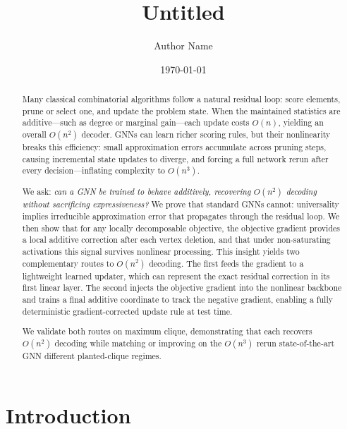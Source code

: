 \documentclass[11pt]{article}
\title{Untitled}
\author{Author Name}
\date{\today}
\theoremstyle{plain}
\theoremstyle{definition}
\theoremstyle{remark}
\begin{document}
\maketitle

\begin{abstract}
  Many classical combinatorial algorithms follow a natural residual loop: score
  elements, prune or select one, and update the problem state. When the maintained
  statistics are additive---such as degree or marginal gain---each update costs $O(n)$,
  yielding an overall $O(n^2)$ decoder. GNNs can learn richer scoring rules, but their
  nonlinearity breaks this efficiency: small approximation errors accumulate across
  pruning steps, causing incremental state updates to diverge, and forcing a full
  network rerun after every decision---inflating complexity to $O(n^3)$.

  We ask: \textit{can a GNN be trained to behave additively, recovering $O(n^2)$
  decoding without sacrificing expressiveness?} We prove that standard GNNs cannot:
  universality implies irreducible approximation error that propagates through the
  residual loop. We then show that for any locally decomposable objective, the objective
  gradient provides a local additive correction after each vertex deletion, and that
  under non-saturating activations this signal survives nonlinear processing. This
  insight yields two complementary routes to $O(n^2)$ decoding. The first feeds the
  gradient to a lightweight learned updater, which can represent the exact residual
  correction in its first linear layer. The second injects the objective gradient into
  the nonlinear backbone and trains a final additive coordinate to track the negative
  gradient, enabling a fully deterministic gradient-corrected update rule at test time.

  We validate both routes on maximum clique, demonstrating that each recovers $O(n^2)$
  decoding while matching or improving on the $O(n^3)$ rerun state-of-the-art GNN different planted-clique regimes.
\end{abstract}

\section{Introduction}
\end{document}
